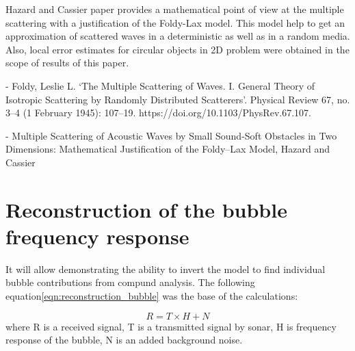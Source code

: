 Hazard and Cassier paper provides a mathematical point of view at the multiple scattering with a justification of the Foldy-Lax model. This model help to get an approximation of scattered waves in a deterministic as well as in a random media. Also, local error estimates for circular objects in 2D problem were obtained in the scope of results of this paper.

- Foldy, Leslie L. ‘The Multiple Scattering of Waves. I. General Theory of Isotropic Scattering by Randomly Distributed Scatterers’. Physical Review 67, no. 3–4 (1 February 1945): 107–19. https://doi.org/10.1103/PhysRev.67.107.

- Multiple Scattering of Acoustic Waves by Small Sound-Soft Obstacles in Two Dimensions: Mathematical Justification of the Foldy–Lax Model, Hazard and Cassier

\section{Reconstruction of the bubble frequency response}

It will allow demonstrating the ability to invert the model to find individual bubble contributions from compund analysis.
The following equation\ref{eqn:reconstruction_bubble} was the base of the calculations:

\begin{equation}\label{eqn:reconstruction_bubble}
    R = T \times H + N
\end{equation}
where R is a received signal, T is a transmitted signal by sonar, H is frequency response of the bubble, N is an added background noise.
